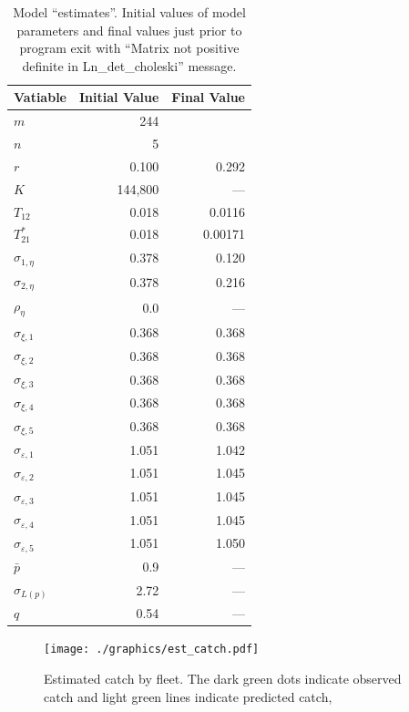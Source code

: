\documentclass[12pt,letterpaper]{article}
\begin{document}
\begin{table}
\label{tab:testrun}
\caption{Model ``estimates''. Initial values of model parameters and
final values just prior to program exit with ``Matrix not positive
definite in Ln\_det\_choleski'' message.}
\begin{center}
\begin{tabular}{lrr}
\hline
Vatiable & Initial Value & Final Value\\
\hline
$m$ &  244\\
$n$ &  5\\
\hline
$r$ & 0.100 &  0.292\\
$K$ & 144,800 & --- \\
$T_{12}$ & 0.018 & 0.0116\\
$T^*_{21}$& 0.018 & 0.00171\\
\hline
$\sigma_{1,\eta}$ & 0.378 & 0.120\\
$\sigma_{2,\eta}$ & 0.378 & 0.216\\
$\rho_\eta$ & 0.0 & --- \\
\hline
$\sigma_{\xi,1}$ & 0.368 & 0.368\\
$\sigma_{\xi,2}$ & 0.368 & 0.368\\
$\sigma_{\xi,3}$ & 0.368 & 0.368\\
$\sigma_{\xi,4}$ & 0.368 & 0.368\\
$\sigma_{\xi,5}$ & 0.368 & 0.368\\
\hline
$\sigma_{\varepsilon,1}$ & 1.051 & 1.042\\
$\sigma_{\varepsilon,2}$ & 1.051 & 1.045\\
$\sigma_{\varepsilon,3}$ & 1.051 & 1.045\\
$\sigma_{\varepsilon,4}$ & 1.051 & 1.045\\
$\sigma_{\varepsilon,5}$ & 1.051 & 1.050\\
\hline
$\bar{p}$ & 0.9 & ---\\
$\sigma_{L(p)}$ & 2.72 & ---\\
$q$ & 0.54 & ---\\
\hline
\end{tabular}
\end{center}
\end{table}


\begin{figure}
\begin{center}
\texttt{[image: ./graphics/est\_catch.pdf]}
\caption{\label{fig:estC}
Estimated catch by fleet. The dark green dots indicate observed catch
and light green lines indicate predicted catch,
}
\end{center}
\end{figure}
\end{document}
